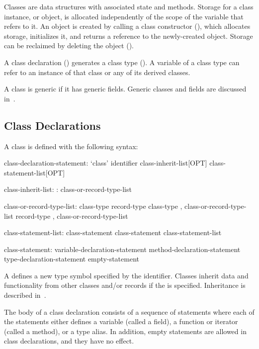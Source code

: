 \label{Classes}

Classes are data structures with associated state and methods. Storage for
a class instance, or object, is allocated independently of the scope of
the variable that refers to it.
An object is created by calling a class constructor
(), which allocates storage, initializes it,
and returns a reference to the newly-created object.
Storage can be reclaimed by deleting the object ().

A class declaration () generates a class
type ().  A variable of a class type can refer to an
instance of that class or any of its derived classes.

A class is generic if it has generic fields. Generic classes and fields
are discussed in~.

\subsection{Class Declarations}
\label{Class_Declarations}

A class is defined with the following syntax:
\begin{syntax}
class-declaration-statement:
  `class' identifier class-inherit-list[OPT] {
    class-statement-list[OPT] }

class-inherit-list:
  : class-or-record-type-list

class-or-record-type-list:
  class-type
  record-type
  class-type , class-or-record-type-list
  record-type , class-or-record-type-list

class-statement-list:
  class-statement
  class-statement class-statement-list

class-statement:
  variable-declaration-statement
  method-declaration-statement
  type-declaration-statement
  empty-statement
\end{syntax}

A  defines a new type symbol
specified by the identifier.  Classes inherit data and functionality
from other classes and/or records if the  is specified.
Inheritance is described in~.

The body of a class declaration consists of a sequence of statements
where each of the statements either defines a variable (called a
field), a function or iterator (called a method), or a type alias.  In addition, empty
statements are allowed in class declarations, and they have no effect.

